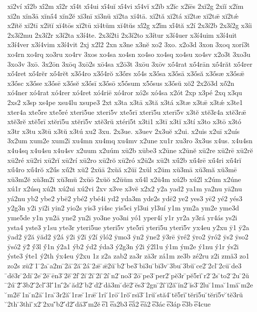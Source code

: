 {xī2ví
xī́2b
xī́2m
xī́2r
xī́4t
xī́4ui
xī́4uĭ
xī́4vi
xī́4vĭ
x2ĭb
x2ĭc
x2ĭēs
2xĭ2g
2xĭĭ
x2ĭm
xĭ2n
xĭn3ā
xĭnā́4
xĭn2ĕ
xĭ3nī
xĭ3nŭ
xĭ2ta
xĭ4tā.
xĭ2tă
xĭ2tá
xĭ2tæ
xĭ2tǣ
xĭ2tǽ
x2ĭtĕ
xĭ2tī
x2ĭtĭ
xĭ4tōs
xĭ2tū
xĭ4tŭm
xĭ4tŭs
xĭ́2g
x2ĭ́m
xĭ́4tă
x2í
2x3í2b
2x3í2g
x3íi
2x3í2mu
2x3í2r
x3í2ta
x3í4te.
2x3í2ti
2x3í2to
x3ítur
x3í4uer
x3í4uim
x3í4uit
x3í4ver
x3í4vim
x3í4vit
2xj
x2l2
2xn
x3ne
x3nĕ
xo2
3xo.
x2o3d
3xon
3xoq
xorí3t
xo4rn
xo4rq
xo3ru
xo4rv
3xos
xo4sa
xo4sn
xo4so
xo4sq
xo4su
xo4sv
x2o3t
3xo3u
3xo3v
3xō.
3x2ōn
3xōq
3xō2s
xō4sa
x2ō3t
3xōu
3xōv
xṓ4rat
xṓ4rān
xṓ4răt
xṓ4rer
xṓ4ret
xṓ4rĕr
xṓ4rĕt
x3ṓ4ro
x3ṓ4rŏ
x3ṓrs
xṓ4s
x3ṓsa
x3ṓsā
x3ṓsă
x3ṓsæ
x3ṓsǣ
x3ṓsc
x3ṓse
x3ṓsē
x3ṓsĕ
x3ṓsī
x3ṓsō
x5ṓsum
x5ṓsus
x3ṓsŭ
xŏ2
2x2ŏ3d
xŏ́2n
xó4ner
xó4rat
xó4rer
xó4ret
xó4riē
xó4ror
xó2s
xó4sa
x2ót
2xp
x3pé
2xq
x3qu
2xs2
x3sp
xs4pe
xsu4lu
xsupe3
2xt
x3ta
x3tā
x3tă
x3tá
x3tæ
x3tǣ
x3tǽ
x3te1
xter4a
xte5re
xte5ré
xteri5ue
xteri5v
xte5rī
xterī5u
xterī5v
x3tĕ
xtĕ3r4a
xtĕ3rǣ
xtĕ3rĕ
xtĕ5rī
xtĕrī5u
xtĕrī5v
xtĕ3rŭ
xtéri5t
x3ti1
x3tī
x3tĭ
x3tí
x3to
x3tō
x3tó
x3tr
x3tu
x3tū
x3tŭ
x3tú
xu2
3xu.
2x3ue.
x3uev
2x3uĕ
x2ui.
x2uis
x2uī
x2uís
3x2um
xum2e
xum2ī
xu4mn
xu4mq
xu4mv
x2une
xu1r
xu3ro
3x3us
x4us.
x4u4sn
x4u4sq
x4u4su
x4u4sv
x2uum
x2uúm
xū2b
xūbe3
x2ūne
x2ūnĕ
xū2re
xū2rē
xū2rĕ
xū2ré
xū2ri
xū2rĭ
xū2rí
xū2ro
xū2rŏ
xū2ró
x2ū2s
xū2t
xū́2b
xū́4rē
xū́4ri
xū́4rĭ
xū́4ro
xū́4rŏ
x2ū́s
xū́2t
xŭ2
2xŭā
2xŭă
x2ŭī
2xŭl
x2ŭm
xŭ3mā
xŭ3mă
xŭ3mē
xŭ3m2ĕ
xŭ3m2ī
xŭ3mŭ
2xŭō
2xŭŏ
x2ŭŭm
xŭ́4l
x2ŭ4́m
xú2b
xú2l
x2úm
x2úne
xú1r
x2úsq
xú2t
xú2ui
xú2vi
2xv
x3ve
x3vĕ
x2x2
y2a
yad2
ya1m
ya2nu
yā2nu
yá2nu
yb2
ybe2
ybē2
ybé2
ybé4i
yd2
yda3m
yde2s
ydē2
ye2
yes3
yē2
yé2
yés3
y2g3n
y2i
yi2i
yin2
yio2s
yis3
yi4sc
yis5ci
yl3ui
yl3uí
y1m
ym2a
ym2e
yme3d
yme5de
y1n
yn2ā
yne2
yn2i
yo3ne
yo3ni
yó1
yper4í
y1r
yr2a
y3rá
yr4ás
ys2i
ysta4
yste3
y1su
yte3r
yteri5ue
yteri5v
yte5rī
yterī5u
yterī5v
yx4eu
y2xu
ȳ1
ȳ2a
ȳad2
ȳ2ă
ȳăd2
ȳ2á
ȳ2i
ȳ2ĭ
ȳ2í
ȳló2
ȳmo3
ȳn2
ȳne2
ȳ3rē
ȳré2
ȳro2
ȳró2
ȳs2
ȳso2
ȳsó2
ȳ2́
ȳ́3l
ȳ́1n
ý2a1
ýb2
ýd2
ýda3
ý2g3n
ý2i
ý2l1u
ý1m
ým2e
ý1nu
ý1r
ýs2i
ýste3
ýte1
ý2th
ýx4eu
ý2xu
1z
z2a
zab2
za3r
ză3r
zá1m
ze3b
zé2ru
z2i
zmă3
zo1
zo2s
zū2
̄1
̄2a
̄a2m
̄2ā
̄2ă
̄2á
̄2ǣ
̄ǣ2ŭ
̄b2
̄be3
̄bī3u
̄bī3v
̄3bu
̄3bŭ
̄ce2
̄2cl
̄2cū
̄de3
̄dĕ3r
̄2dī
̄2e
̄2ē
̄ēn3
̄2ĕ
̄2f
̄2i
̄2ī
̄2ĭ
̄2í
̄n2
̄no3
̄2ō
̄pe3
̄per2
̄pĕ3r
̄pĕ5rĭ
̄r2
̄2s
̄to2
̄2u
̄2ŭ
̄2ú
̄2́
̄́3b2
̄́2cl
̄́3l
̄́1n
̄́2s
̆ăd2
̆b2
̆d2
̆dă3m
̆dē2
̆ĕs3
̆2gn
̆2ĭ
̆ĭ2ă
̆ĭn2
̆ĭs3
̆2lu
̆1ma
̆1mă
̆m2e
̆m2ĕ
̆1n
̆n2ā
̆1ra
̆3r2ă
̆1ræ
̆1rǣ
̆1rī
̆1rō
̆1rŏ
̆rsĭ3
̆1rŭ
̆stă4
̆tĕ5rī
̆tĕrī5u
̆tĕrī5v
̆tĕ3rŭ
̆2th
̆3thĭ
̆x2
̆2xu
̆́b2
̆́d2
̆́dă3
̆́m2ĕ
͞e1
͞ea2b3
͞eắ2
͞eá2
͞e3ác
͞e3áp
͞e3b
͞e4cue
}

